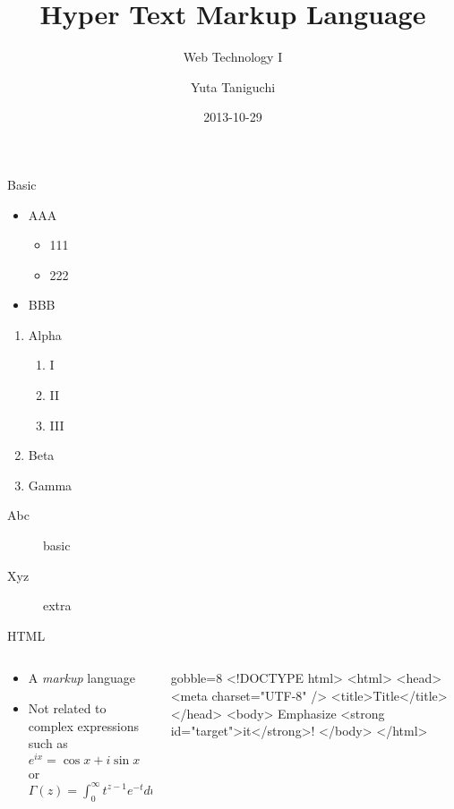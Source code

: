 \documentclass[14pt,t]{beamer}
\title{Hyper Text Markup Language}
\subtitle{Web Technology I}
\author{Yuta Taniguchi}
\institute{@yuttieyuttie}
\date{2013-10-29}
\begin{document}
{
  \frame{\titlepage}
}
\setcounter{framenumber}{0}


\begin{frame}{Basic}
  \begin{itemize}
  \item AAA
    \begin{itemize}
    \item 111
    \item 222
    \end{itemize}
  \item BBB
  \end{itemize}
  \begin{enumerate}
  \item Alpha
    \begin{enumerate}
    \item I
    \item II
    \item III
    \end{enumerate}
  \item Beta
  \item Gamma
  \end{enumerate}
  \begin{description}
  \item[Abc] basic
  \item[Xyz] extra
  \end{description}
\end{frame}


\begin{frame}[fragile]{HTML}
  \begin{columns}
    \begin{column}{0.4\textwidth}
      \begin{itemize}
        \item A \emph{markup} language
        \item Not related to complex expressions such as
          $e^{ix} = \cos x + i \sin x$ or
          $\Gamma(z) = \int_0^\infty t^{z-1} e^{-t} dt$
      \end{itemize}
    \end{column}
    \begin{column}{0.6\textwidth}
      \begin{html*}{gobble=8}
        <!DOCTYPE html>
        <html>
          <head>
            <meta charset="UTF-8" />
            <title>Title</title>
          </head>
          <body>
            Emphasize
            <strong id="target">it</strong>!
          </body>
        </html>
      \end{html*}
    \end{column}
  \end{columns}
\end{frame}
\end{document}
